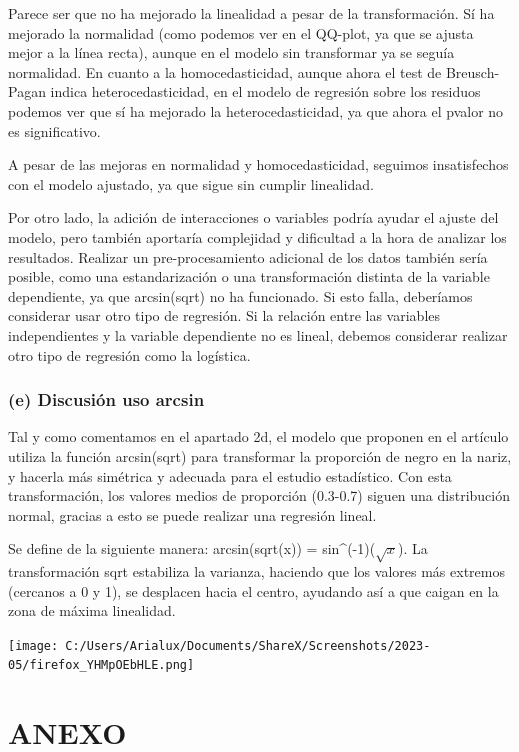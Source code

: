\documentclass[
]{article}
\begin{document}
Parece ser que no ha mejorado la linealidad a pesar de la
transformación. Sí ha mejorado la normalidad (como podemos ver en el
QQ-plot, ya que se ajusta mejor a la línea recta), aunque en el modelo
sin transformar ya se seguía normalidad. En cuanto a la
homocedasticidad, aunque ahora el test de Breusch-Pagan indica
heterocedasticidad, en el modelo de regresión sobre los residuos podemos
ver que sí ha mejorado la heterocedasticidad, ya que ahora el pvalor no
es significativo.

A pesar de las mejoras en normalidad y homocedasticidad, seguimos
insatisfechos con el modelo ajustado, ya que sigue sin cumplir
linealidad.

Por otro lado, la adición de interacciones o variables podría ayudar el
ajuste del modelo, pero también aportaría complejidad y dificultad a la
hora de analizar los resultados. Realizar un pre-procesamiento adicional
de los datos también sería posible, como una estandarización o una
transformación distinta de la variable dependiente, ya que arcsin(sqrt)
no ha funcionado. Si esto falla, deberíamos considerar usar otro tipo de
regresión. Si la relación entre las variables independientes y la
variable dependiente no es lineal, debemos considerar realizar otro tipo
de regresión como la logística.

\hypertarget{e-discusiuxf3n-uso-arcsin}{%
\subsubsection{(e) Discusión uso
arcsin}\label{e-discusiuxf3n-uso-arcsin}}

Tal y como comentamos en el apartado 2d, el modelo que proponen en el
artículo utiliza la función arcsin(sqrt) para transformar la proporción
de negro en la nariz, y hacerla más simétrica y adecuada para el estudio
estadístico. Con esta transformación, los valores medios de proporción
(0.3-0.7) siguen una distribución normal, gracias a esto se puede
realizar una regresión lineal.

Se define de la siguiente manera: arcsin(sqrt(x)) =
sin\^{}(-1)(\(\sqrt{x}\)). La transformación sqrt estabiliza la
varianza, haciendo que los valores más extremos (cercanos a 0 y 1), se
desplacen hacia el centro, ayudando así a que caigan en la zona de
máxima linealidad.

\texttt{[image: C:/Users/Arialux/Documents/ShareX/Screenshots/2023-05/firefox\_YHMpOEbHLE.png]}

\hypertarget{anexo}{%
\section{ANEXO}\label{anexo}}
\end{document}
